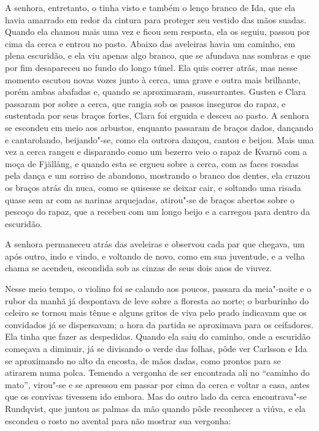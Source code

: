 A senhora, entretanto, o tinha visto e também o lenço branco de Ida, que ela
havia amarrado em redor da cintura para proteger seu vestido das mãos suadas.
Quando ela chamou mais uma vez e ficou sem resposta, ela os seguiu, passou por
cima da cerca e entrou no pasto. Abaixo das aveleiras havia um caminho, em plena
escuridão, e ela viu apenas algo branco, que se afundava nas sombras e que por fim
desapareceu no fundo do longo túnel. Ela quis correr atrás, mas nesse momento
escutou novas vozes junto à cerca, uma grave e outra mais brilhante, porém ambas
abafadas e, quando se aproximaram, sussurrantes. Gusten e Clara passaram por
sobre a cerca, que rangia sob os passos inseguros do rapaz, e sustentada por
seus braços fortes, Clara foi erguida e desceu ao pasto. A senhora se escondeu
em meio aos arbustos, enquanto passaram de braços dados, dançando e
cantarolando, beijando"-se, como ela outrora dançou, cantou e beijou. Mais uma
vez a cerca rangeu e disparando como um bezerro veio o rapaz de Kvarnö com a
moça de Fjällång, e quando esta se ergueu sobre a cerca, com as faces rosadas
pela dança e um sorriso de abandono, mostrando o branco dos dentes, ela cruzou
os braços atrás da nuca, como se quisesse se deixar cair, e soltando uma risada
quase sem ar com as narinas arquejadas, atirou"-se de braços abertos sobre o
pescoço do rapaz, que a recebeu com um longo beijo e a carregou para dentro da
escuridão.

A senhora permaneceu atrás das aveleiras e observou cada par que chegava, um após outro, indo e vindo,
e voltando de novo, como em sua juventude, e a velha chama se acendeu, escondida
sob as cinzas de seus dois anos de viuvez.

Nesse meio tempo, o violino foi se calando aos poucos, passara da meia"-noite 
e o rubor da manhã já despontava de leve sobre a floresta ao norte;
o burburinho do celeiro se tornou mais tênue e alguns gritos de viva pelo prado
indicavam que os convidados já se dispersavam; a hora da partida se aproximava
para os ceifadores. Ela tinha que fazer as despedidas. Quando ela saiu do
caminho, onde a escuridão começava a diminuir, já se divisando o verde das
folhas, pôde ver Carlsson e Ida se aproximando no alto da encosta, de mãos dadas,
como prontos para se atirarem numa polca. Temendo a vergonha de ser encontrada
ali no ``caminho do mato'', virou"-se e se apressou em passar por cima da cerca e
voltar a casa, antes que os convivas tivessem ido embora. Mas do outro lado da
cerca encontrava"-se Rundqvist, que juntou as palmas da mão quando pôde
reconhecer a viúva, e ela escondeu o rosto no avental para não mostrar sua
vergonha:


